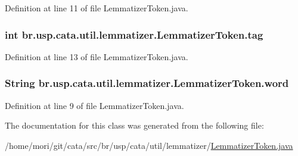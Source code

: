 Definition at line 11 of file Lemmatizer\+Token.\+java.

\hypertarget{classbr_1_1usp_1_1cata_1_1util_1_1lemmatizer_1_1_lemmatizer_token_a764a714dcb0fe100c9e3f20451bd799b}{
\subsubsection[{tag}]{\setlength{\rightskip}{0pt plus 5cm}int br.\+usp.\+cata.\+util.\+lemmatizer.\+Lemmatizer\+Token.\+tag\hspace{0.3cm}{\ttfamily [private]}}}\label{classbr_1_1usp_1_1cata_1_1util_1_1lemmatizer_1_1_lemmatizer_token_a764a714dcb0fe100c9e3f20451bd799b}


Definition at line 13 of file Lemmatizer\+Token.\+java.

\hypertarget{classbr_1_1usp_1_1cata_1_1util_1_1lemmatizer_1_1_lemmatizer_token_af91667ab0a104dc6fa74545485e8be01}{
\subsubsection[{word}]{\setlength{\rightskip}{0pt plus 5cm}String br.\+usp.\+cata.\+util.\+lemmatizer.\+Lemmatizer\+Token.\+word\hspace{0.3cm}{\ttfamily [private]}}}\label{classbr_1_1usp_1_1cata_1_1util_1_1lemmatizer_1_1_lemmatizer_token_af91667ab0a104dc6fa74545485e8be01}


Definition at line 9 of file Lemmatizer\+Token.\+java.



The documentation for this class was generated from the following file\+:\begin{DoxyCompactItemize}
\item 
/home/mori/git/cata/src/br/usp/cata/util/lemmatizer/\hyperlink{_lemmatizer_token_8java}{Lemmatizer\+Token.\+java}\end{DoxyCompactItemize}
